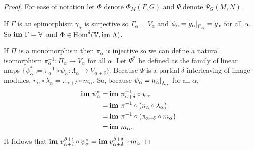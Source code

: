 \begin{proof}
  For ease of notation let $\Phi$ denote $\Phi_M(F, G)$ and $\Psi$ denote $\Psi_G(M, N)$.

  If $\Gamma$ is an epimorphism $\gamma_\alpha$ is surjective so $\Gamma_\alpha = V_\alpha$ and $\phi_{\alpha} = g_{\alpha}\mathord{\mid}_{\Gamma_\alpha} = g_\alpha$ for all $\alpha$.
  So $\mathbf{im}~\Gamma = \mathbb{V}$ and $\Phi\in\mathrm{Hom}^\delta(\mathbb{V},\mathbf{im}~\Lambda)$.

  If $\Pi$ is a monomorphism then $\pi_\alpha$ is injective so we can define a natural isomorphism $\pi_\alpha^{-1} : \Pi_\alpha\to V_\alpha$ for all $\alpha$.
  Let $\Psi^*$ be defined as the family of linear maps $\{\psi_\alpha^* := \pi^{-1}_\alpha \circ \psi_\alpha : \Lambda_\alpha\to V_{\alpha+\delta}\}$.
  Because $\Psi$ is a partial $\delta$-interleaving of image modules, $n_\alpha\circ\lambda_\alpha = \pi_{\alpha+\delta}\circ m_\alpha$.
  So, because $\psi_\alpha = n_\alpha\mathord{\mid}_{\Lambda_\alpha}$ for all $\alpha$,
  \begin{align*}
    \mathbf{im}~\psi_\alpha^* &= \mathbf{im}~\pi^{-1}_{\alpha+\delta}\circ\psi_\alpha\\
                      &= \mathbf{im}~\pi^{-1}\circ (n_\alpha\circ\lambda_\alpha)\\
                      &= \mathbf{im}~\pi^{-1}\circ (\pi_{\alpha+\delta}\circ m_\alpha)\\
                      &= \mathbf{im}~ m_\alpha.
  \end{align*}
  It follows that $\mathbf{im}~v_{\alpha+\delta}^{\beta+\delta}\circ\psi_\alpha^* = \mathbf{im}~v_{\alpha+\delta}^{\beta+\delta}\circ m_\alpha$



\end{proof}
